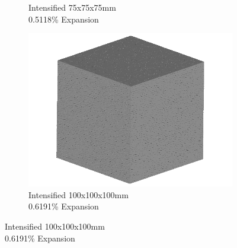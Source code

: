 \begin{figure}[ht!]
\begin{subfigure}{.3\textwidth}
    \caption{Intensified 75x75x75mm \\  0.5118\% Expansion}
    \end{subfigure}
    \begin{subfigure}{.3\textwidth}
      \centering
      \includegraphics[width=.9\linewidth]{Files/exp_3D/DEF/A30X-1C_3_3d.png}
    \caption{Intensified 100x100x100mm \\  0.6191\% Expansion}
    \end{subfigure}%


\end{figure}
